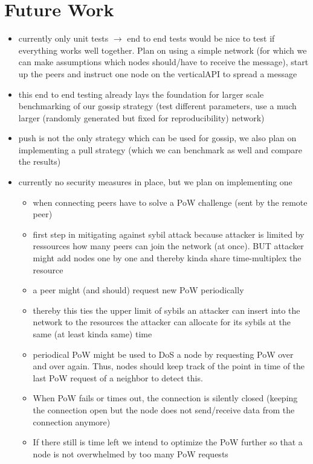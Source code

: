 \documentclass[a4paper,english,10pt,NET]{tumarticle}
\newcommand{\tos}{$\to$\xspace}
\begin{document}
\section{Future Work} \label{sec:future}
\begin{itemize}
	\item currently only unit tests \tos end to end tests would be nice to test if everything works well together. Plan on using a simple network (for which we can make assumptions which nodes should/have to receive the message), start up the peers and instruct one node on the verticalAPI to spread a message
	\item this end to end testing already lays the foundation for larger scale benchmarking of our gossip strategy (test different parameters, use a much larger (randomly generated but fixed for reproducibility) network)
	\item push is not the only strategy which can be used for gossip, we also plan on implementing a pull strategy (which we can benchmark as well and compare the results)
	\item currently no security measures in place, but we plan on implementing one
		\begin{itemize}
			\item when connecting peers have to solve a PoW challenge (sent by the remote peer)
			\item first step in mitigating against sybil attack because attacker is limited by ressources how many peers can join the network (at once). BUT attacker might add nodes one by one and thereby kinda share time-multiplex the resource
			\item a peer might (and should) request new PoW periodically
			\item thereby this ties the upper limit of sybils an attacker can insert into the network to the resources the attacker can allocate for its sybils at the same (at least kinda same) time
			\item periodical PoW might be used to DoS a node by requesting PoW over and over again. Thus, nodes should keep track of the point in time of the last PoW request of a neighbor to detect this.
			\item When PoW fails or times out, the connection is silently closed (keeping the connection open but the node does not send/receive data from the connection anymore)
			\item If there still is time left we intend to optimize the PoW further so that a node is not overwhelmed by too many PoW requests
		\end{itemize}
\end{itemize}
\end{document}
